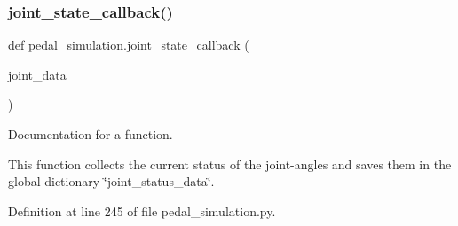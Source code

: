 \subsubsection{\texorpdfstring{joint\_state\_callback()}{joint\_state\_callback()}}
{\footnotesize\ttfamily def pedal\+\_\+simulation.\+joint\+\_\+state\+\_\+callback (\begin{DoxyParamCaption}\item[{}]{joint\+\_\+data }\end{DoxyParamCaption})}



Documentation for a function. 

This function collects the current status of the joint-\/angles and saves them in the global dictionary \char`\"{}joint\+\_\+status\+\_\+data\char`\"{}. 

Definition at line 245 of file pedal\+\_\+simulation.\+py.


